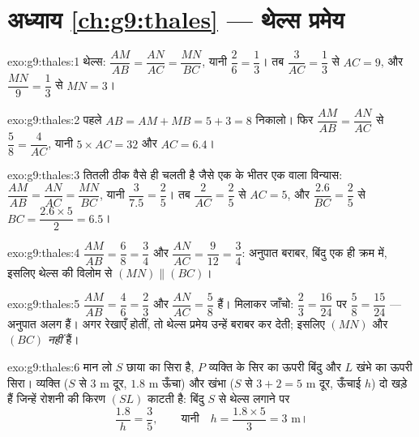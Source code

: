 \section*{अध्याय \ref{ch:g9:thales} --- थेल्स प्रमेय}

\begin{solution}{exo:g9:thales:1}
थेल्स: $\dfrac{AM}{AB} = \dfrac{AN}{AC} = \dfrac{MN}{BC}$, यानी
$\dfrac26 = \dfrac13$। तब $\dfrac{3}{AC} = \dfrac13$ से $AC = 9$, और
$\dfrac{MN}{9} = \dfrac13$ से $MN = 3$।
\end{solution}

\begin{solution}{exo:g9:thales:2}
पहले $AB = AM + MB = 5 + 3 = 8$ निकालो। फिर
$\dfrac{AM}{AB} = \dfrac{AN}{AC}$ से $\dfrac58 = \dfrac{4}{AC}$, यानी
$5 \times AC = 32$ और $AC = 6.4$।
\end{solution}

\begin{solution}{exo:g9:thales:3}
तितली ठीक वैसे ही चलती है जैसे एक के भीतर एक वाला विन्यास:
$\dfrac{AM}{AB} = \dfrac{AN}{AC} = \dfrac{MN}{BC}$, यानी
$\dfrac{3}{7.5} = \dfrac25$। तब $\dfrac{2}{AC} = \dfrac25$ से
$AC = 5$, और $\dfrac{2.6}{BC} = \dfrac25$ से
$BC = \dfrac{2.6 \times 5}{2} = 6.5$।
\end{solution}

\begin{solution}{exo:g9:thales:4}
$\dfrac{AM}{AB} = \dfrac68 = \dfrac34$ और
$\dfrac{AN}{AC} = \dfrac{9}{12} = \dfrac34$: अनुपात बराबर, बिंदु एक ही
क्रम में, इसलिए थेल्स की विलोम से $(MN) \parallel (BC)$।
\end{solution}

\begin{solution}{exo:g9:thales:5}
$\dfrac{AM}{AB} = \dfrac46 = \dfrac23$ और
$\dfrac{AN}{AC} = \dfrac58$ हैं। मिलाकर जाँचो:
$\dfrac23 = \dfrac{16}{24}$ पर $\dfrac58 = \dfrac{15}{24}$ --- अनुपात
अलग हैं। अगर रेखाएँ  होतीं, तो थेल्स प्रमेय उन्हें बराबर कर
देती; इसलिए $(MN)$ और $(BC)$  \emph{नहीं} हैं।
\end{solution}

\begin{solution}{exo:g9:thales:6}
मान लो $S$ छाया का सिरा है, $P$ व्यक्ति के सिर का ऊपरी बिंदु और $L$
खंभे का ऊपरी सिरा। व्यक्ति ($S$ से $3$ m दूर, $1.8$ m ऊँचा) और खंभा
($S$ से $3 + 2 = 5$ m दूर, ऊँचाई $h$) दो  खड़े  हैं
जिन्हें रोशनी की किरण $(SL)$ काटती है: बिंदु $S$ से थेल्स लगाने पर
\[
\frac{1.8}{h} = \frac{3}{5},
\qquad\text{यानी}\quad
h = \frac{1.8 \times 5}{3} = 3 \text{ m।}
\]
\end{solution}

